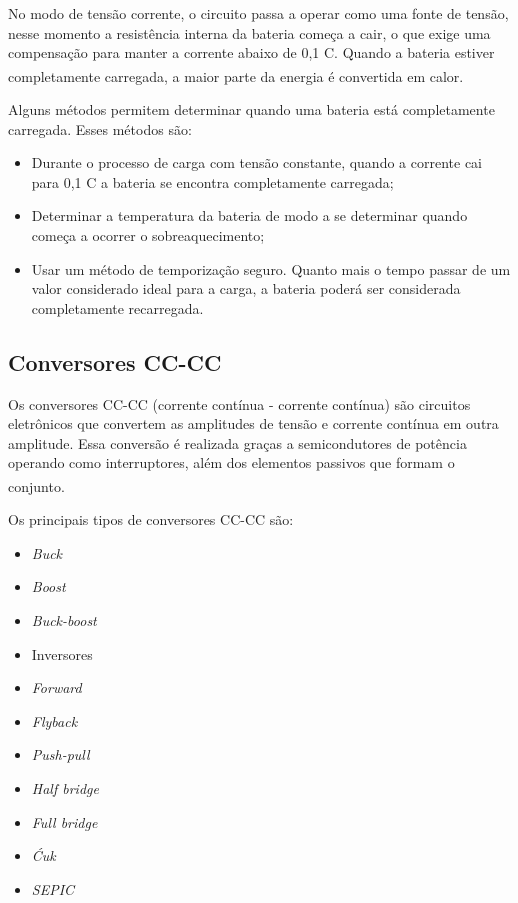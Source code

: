 \documentclass[
	12pt,				%
	openright,			%
	oneside,			%
	a4paper,			%
	english,			%
	french,				%
	spanish,			%
	brazil,				%
	oldfontcommands
	]{abntex2}
\begin{document}
	No modo de tensão corrente, o circuito passa a operar como uma fonte de tensão, nesse momento a resistência interna da bateria começa a cair, o que exige uma compensação para manter a corrente abaixo de 0,1 C. Quando a bateria estiver completamente carregada, a maior parte da energia é convertida em calor.\textsuperscript{\cite{carregador}}

	Alguns métodos permitem determinar quando uma bateria está completamente carregada. Esses métodos são:
	
	\begin{itemize}
		\item Durante o processo de carga com tensão constante, quando a corrente cai para 0,1 C a bateria se encontra completamente carregada;
		\item Determinar a temperatura da bateria de modo a se determinar quando começa a ocorrer o sobreaquecimento;
		\item Usar um método de temporização seguro. Quanto mais o tempo passar de um valor considerado ideal para a carga, a bateria poderá ser considerada completamente recarregada.
	\end{itemize}

\subsection[Conversores CC-CC]{Conversores CC-CC}

	Os conversores CC-CC (corrente contínua - corrente contínua) são circuitos eletrônicos que convertem as amplitudes de tensão e corrente contínua em outra amplitude. Essa conversão é realizada graças a semicondutores de potência operando como interruptores, além dos elementos passivos que formam o conjunto.\textsuperscript{\cite{semicondutores3}}
	
	Os principais tipos de conversores CC-CC são:
	
	\begin{minipage}{7cm}
		\begin{itemize}
			\item	\textit{Buck}
			\item	\textit{Boost}
			\item	\textit{Buck-boost}
			\item	Inversores
			\item	\textit{Forward}
			\item	\textit{Flyback}
	\end{itemize}
	\end{minipage}
	\begin{minipage}{7cm}
		\begin{itemize}
			\item	\textit{Push-pull}
			\item	\textit{Half bridge}
			\item	\textit{Full bridge}
			\item	\textit{Ćuk}
			\item	\textit{SEPIC}
		\end{itemize}
	\end{minipage}
\end{document}
